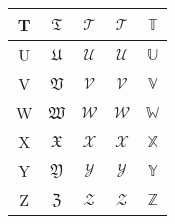 \documentclass[a4paper,12pt]{article}
\theoremstyle{plain} %
\theoremstyle{definition} %
\theoremstyle{remark} %
\begin{document}
\begin{tabular}{|c|c|c|c|c|}
\hline 
T & $\mathfrak{T}$ & $\mathscr{T}$ & $\mathcal{T}$ &  $\mathbb{T}$ \\ 
\hline 
U & $\mathfrak{U}$ & $\mathscr{U}$ & $\mathcal{U}$ &  $\mathbb{U}$ \\ 
\hline 
V & $\mathfrak{V}$ & $\mathscr{V}$ & $\mathcal{V}$ &  $\mathbb{V}$ \\ 
\hline 
W & $\mathfrak{W}$ & $\mathscr{W}$ & $\mathcal{W}$ &  $\mathbb{W}$ \\ 
\hline 
X & $\mathfrak{X}$ & $\mathscr{X}$ & $\mathcal{X}$ &  $\mathbb{X}$ \\ 
\hline 
Y & $\mathfrak{Y}$ & $\mathscr{Y}$ & $\mathcal{Y}$ &  $\mathbb{Y}$ \\ 
\hline 
Z & $\mathfrak{Z}$ & $\mathscr{Z}$ & $\mathcal{Z}$ &  $\mathbb{Z}$ \\  
\hline 
\end{tabular} 
\end{document}

